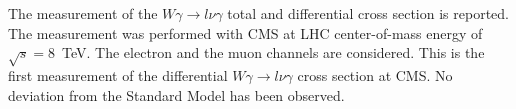 The measurement of the $W\gamma\rightarrow l\nu\gamma$ total and differential cross section is reported. The measurement was performed with CMS at LHC center-of-mass energy of $\sqrt{s}=$8~TeV. The electron and the muon channels are considered. This is the first measurement of the differential $W\gamma\rightarrow l\nu\gamma$ cross section at CMS. No deviation from the Standard Model has been observed.
